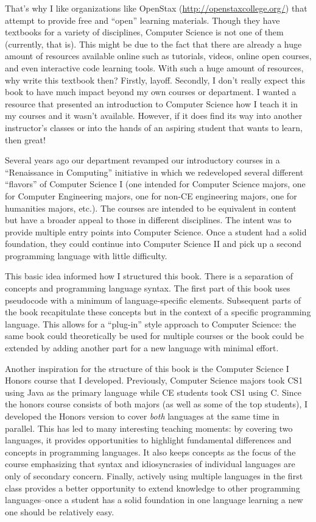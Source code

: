 That's why I like organizations like OpenStax (\url{http://openstaxcollege.org/}) that attempt to provide 
free and ``open'' learning materials.  Though they have textbooks for a variety of disciplines, Computer
Science is not one of them (currently, that is).  This might be due to the fact that there are already a 
huge amount of resources available online such as tutorials, videos, online open courses, and even
interactive code learning tools.  With such a huge amount of resources, why write this textbook then?  
Firstly, layoff.  Secondly, I don't really expect this book to have much impact beyond my own courses or
department.  I wanted a resource that presented an introduction to Computer Science how I teach it in my courses and
it wasn't available.  However, if it does find its way into another instructor's classes or into the hands
of an aspiring student that wants to learn, then great!

Several years ago our department revamped our introductory courses in a ``Renaissance in Computing''
initiative in which we redeveloped several different ``flavors'' of Computer Science I (one intended for
Computer Science majors, one for Computer Engineering majors, one for non-CE engineering majors, 
one for humanities majors, etc.).  The courses are intended to be equivalent in content but have a 
broader appeal to those in different disciplines.  The intent was to provide multiple entry points into
Computer Science.  Once a student had a solid foundation, they could continue into Computer Science
II and pick up a second programming language with little difficulty.  

This basic idea informed how I structured this book.  There is a separation of concepts and 
programming language syntax.  The first part of this book uses pseudocode with a 
minimum of language-specific elements.  Subsequent parts of the book recapitulate these concepts
but in the context of a specific programming language.  This allows for a ``plug-in'' style approach
to Computer Science: the same book could theoretically be used for multiple courses or the
book could be extended by adding another part for a new language with minimal effort.

Another inspiration for the structure of this book is the Computer Science I Honors course that
I developed.  Previously, Computer Science majors took CS1 using Java as the primary language
while CE students took CS1 using C.  Since the honors course consists of both majors (as well
as some of the top students), I developed the Honors version to cover \emph{both} languages
at the same time in parallel.  This has led to many interesting teaching moments: by covering
two languages, it provides opportunities to highlight fundamental differences and concepts
in programming languages.  It also keeps concepts as the focus of the course emphasizing
that syntax and idiosyncrasies of individual languages are only of secondary concern.  Finally, 
actively using multiple languages in the first class provides a better opportunity to extend 
knowledge to other programming languages--once a student has a solid foundation in one
language learning a new one should be relatively easy.  

